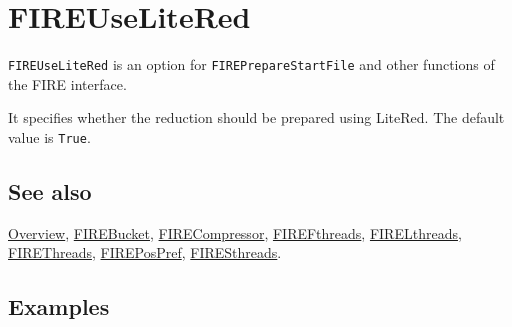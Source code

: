 \documentclass[../FeynHelpersManual.tex]{subfiles}
\begin{document}
\hypertarget{fireuselitered}{
\section{FIREUseLiteRed}\label{fireuselitered}}

\texttt{FIREUseLiteRed} is an option for \texttt{FIREPrepareStartFile}
and other functions of the FIRE interface.

It specifies whether the reduction should be prepared using LiteRed. The
default value is \texttt{True}.

\subsection{See also}

\hyperlink{toc}{Overview}, \hyperlink{firebucket}{FIREBucket},
\hyperlink{firecompressor}{FIRECompressor},
\hyperlink{firefthreads}{FIREFthreads},
\hyperlink{firelthreads}{FIRELthreads},
\hyperlink{firethreads}{FIREThreads},
\hyperlink{firepospref}{FIREPosPref},
\hyperlink{firesthreads}{FIRESthreads}.

\subsection{Examples}
\end{document}
